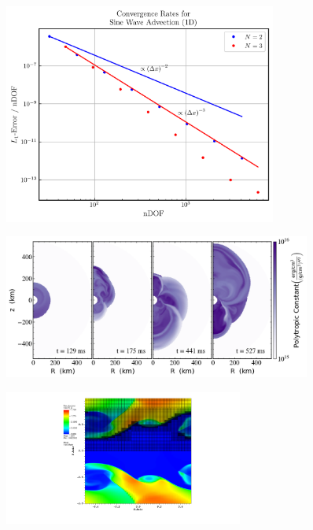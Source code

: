 \documentclass{beamer}
\begin{document}
\begin{frame}

  \begin{figure}[htb!]
    \centering
    \includegraphics[width=0.8\textwidth]{fig.ConvergenceRates.png}
  \end{figure}

\end{frame}

\begin{frame}

  \begin{figure}[htb!]
    \centering
    \includegraphics[width=0.9\textwidth]{fig.sasi.png}
  \end{figure}

\end{frame}

\begin{frame}

  \begin{figure}[htb!]
    \centering
    \includegraphics[width=0.7\textwidth]{fig.KHI.pdf}
  \end{figure}

\end{frame}
\end{document}
